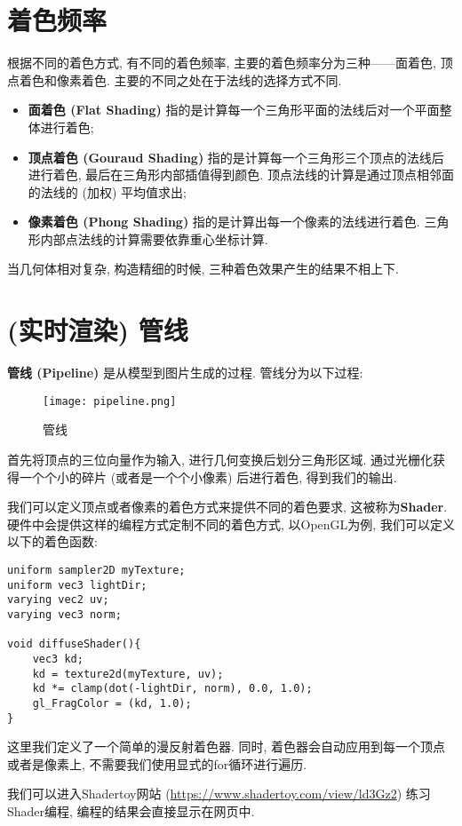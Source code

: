 \documentclass[openany]{progbookcn}
\begin{document}
\section{着色频率}
根据不同的着色方式, 有不同的着色频率, 主要的着色频率分为三种——面着色, 顶点着色和像素着色. 主要的不同之处在于法线的选择方式不同. 

\begin{itemize}
	\item \textbf{面着色 (Flat Shading) }指的是计算每一个三角形平面的法线后对一个平面整体进行着色; 
	\item \textbf{顶点着色 (Gouraud Shading) }指的是计算每一个三角形三个顶点的法线后进行着色, 最后在三角形内部插值得到颜色. 顶点法线的计算是通过顶点相邻面的法线的 (加权) 平均值求出; 
	\item \textbf{像素着色 (Phong Shading) }指的是计算出每一个像素的法线进行着色. 三角形内部点法线的计算需要依靠重心坐标计算. 
\end{itemize}
当几何体相对复杂, 构造精细的时候, 三种着色效果产生的结果不相上下. 

\section{ (实时渲染) 管线}
\textbf{管线 (Pipeline) }是从模型到图片生成的过程. 管线分为以下过程: 
\begin{figure}[H]
	\centering
	\texttt{[image: pipeline.png]}
	\caption{管线}
	\label{fig:pipeline}
\end{figure}

首先将顶点的三位向量作为输入, 进行几何变换后划分三角形区域. 通过光栅化获得一个个小的碎片 (或者是一个个小像素) 后进行着色, 得到我们的输出. 

我们可以定义顶点或者像素的着色方式来提供不同的着色要求, 这被称为\textbf{Shader}. 硬件中会提供这样的编程方式定制不同的着色方式, 以OpenGL为例, 我们可以定义以下的着色函数: 
\begin{lstlisting}
uniform sampler2D myTexture;
uniform vec3 lightDir;
varying vec2 uv;
varying vec3 norm;

void diffuseShader(){
	vec3 kd;
	kd = texture2d(myTexture, uv);
	kd *= clamp(dot(-lightDir, norm), 0.0, 1.0);
	gl_FragColor = (kd, 1.0);
}
\end{lstlisting}
这里我们定义了一个简单的漫反射着色器. 同时, 着色器会自动应用到每一个顶点或者是像素上, 不需要我们使用显式的for循环进行遍历. 

\begin{information}
	我们可以进入Shadertoy网站 (\url{https://www.shadertoy.com/view/ld3Gz2}) 练习Shader编程, 编程的结果会直接显示在网页中. 
\end{information}
\end{document}
